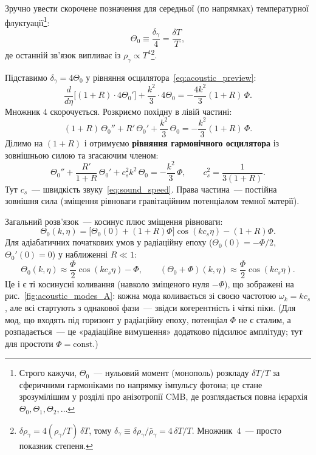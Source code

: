 Зручно увести скорочене позначення для середньої
(по напрямках) температурної флуктуації\footnote{%
Строго кажучи, $\Theta_0$~--- нульовий момент (монополь)
розкладу $\delta T/T$ за сферичними гармоніками по напрямку
імпульсу фотона; це стане зрозумілішим у розділі про
анізотропії CMB, де розглядається повна ієрархія
$\Theta_0, \Theta_1, \Theta_2,\ldots$}:
\begin{equation}\label{eq:Theta0_def}
  \Theta_0 \equiv \frac{\delta_\gamma}{4} = \frac{\delta T}{T},
\end{equation}
де останній зв'язок випливає із $\rho_\gamma \propto T^4$\footnote{%
$\delta\rho_\gamma = 4(\rho_\gamma/T)\,\delta T$,
тому $\delta_\gamma \equiv \delta\rho_\gamma/\bar\rho_\gamma
= 4\,\delta T/T$.
Множник~$4$~--- просто показник степеня.}.

Підставимо $\delta_\gamma = 4\Theta_0$ у рівняння
осцилятора~\eqref{eq:acoustic_preview}:
\begin{equation*}
  \frac{d}{d\eta}\bigl[(1+R)\cdot 4\Theta_0'\bigr]
  + \frac{k^2}{3}\cdot 4\Theta_0
  = -\frac{4k^2}{3}(1+R)\,\Phi.
\end{equation*}
Множник $4$ скорочується. Розкриємо похідну в лівій частині:
\begin{equation*}
  (1+R)\,\Theta_0'' + R'\,\Theta_0'
  + \frac{k^2}{3}\,\Theta_0
  = -\frac{k^2}{3}(1+R)\,\Phi.
\end{equation*}
Ділимо на $(1+R)$ і отримуємо \textbf{рівняння гармонічного осцилятора}
із зовнішньою силою та згасаючим членом:
\begin{equation}\label{eq:Theta0_osc}
  \Theta_0'' + \frac{R'}{1+R}\,\Theta_0'
  + c_s^2 k^2\,\Theta_0 = -\frac{k^2}{3}\,\Phi,
  \qquad c_s^2 = \frac{1}{3(1+R)}.
\end{equation}
Тут $c_s$~--- швидкість звуку~\eqref{eq:sound_speed}.
Права частина~--- постійна зовнішня сила (зміщення рівноваги
гравітаційним потенціалом темної матерії).

Загальний розв'язок~--- косинус плюс зміщення рівноваги:
\[
  \Theta_0(k,\eta)
  = \bigl[\Theta_0(0) + (1+R)\Phi\bigr]\cos(k c_s \eta)
    - (1+R)\Phi.
\]
Для адіабатичних початкових умов у радіаційну епоху ($\Theta_0(0) = -\Phi/2$,
$\Theta_0'(0) = 0$) у наближенні $R \ll 1$:
\begin{equation}\label{eq:Theta0_solution}
  \Theta_0(k,\eta) \approx \frac{\Phi}{2}\cos(k c_s \eta) - \Phi,
  \qquad
  (\Theta_0 + \Phi)(k,\eta) \approx \frac{\Phi}{2}\cos(k c_s \eta).
\end{equation}
Це і є ті косинусні коливання (навколо зміщеного нуля $-\Phi$), що зображені на
рис.~\ref{fig:acoustic_modes_A}: кожна мода коливається
зі своєю частотою $\omega_k = k c_s$, але всі стартують
з однакової фази~--- звідси когерентність і чіткі піки.
(Для мод, що входять під горизонт у радіаційну епоху, потенціал $\Phi$ не є сталим, а розпадається~--- це «радіаційне вимушення» додатково підсилює амплітуду; тут для простоти $\Phi=\mathrm{const}$.)


